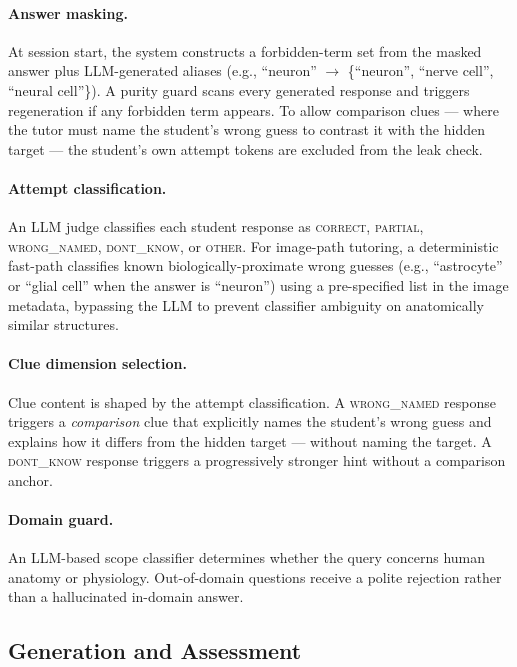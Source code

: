 \documentclass[11pt]{article}
\begin{document}
\paragraph{Answer masking.}
At session start, the system constructs a forbidden-term set from the masked
answer plus LLM-generated aliases (e.g., ``neuron'' $\to$
\{``neuron'', ``nerve cell'', ``neural cell''\}).
A purity guard scans every generated response and triggers regeneration if any
forbidden term appears.
To allow comparison clues --- where the tutor must name the student's wrong
guess to contrast it with the hidden target --- the student's own attempt
tokens are excluded from the leak check.

\paragraph{Attempt classification.}
An LLM judge classifies each student response as \textsc{correct},
\textsc{partial}, \textsc{wrong\_named}, \textsc{dont\_know}, or
\textsc{other}.
For image-path tutoring, a deterministic fast-path classifies known
biologically-proximate wrong guesses (e.g., ``astrocyte'' or ``glial cell''
when the answer is ``neuron'') using a pre-specified list in the image
metadata, bypassing the LLM to prevent classifier ambiguity on
anatomically similar structures.

\paragraph{Clue dimension selection.}
Clue content is shaped by the attempt classification.
A \textsc{wrong\_named} response triggers a \emph{comparison} clue that
explicitly names the student's wrong guess and explains how it differs from
the hidden target --- without naming the target.
A \textsc{dont\_know} response triggers a progressively stronger hint without
a comparison anchor.

\paragraph{Domain guard.}
An LLM-based scope classifier determines whether the query concerns human
anatomy or physiology.
Out-of-domain questions receive a polite rejection rather than a hallucinated
in-domain answer.

\subsection{Generation and Assessment}
\end{document}
